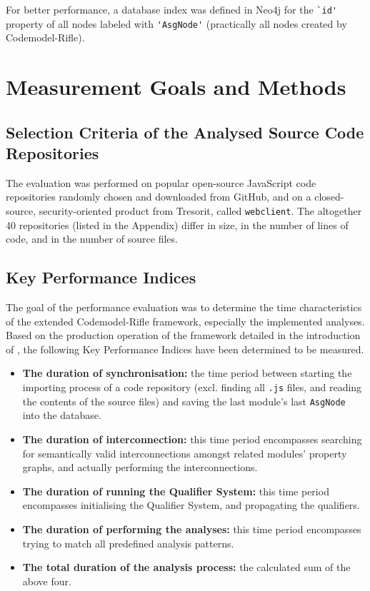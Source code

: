For better performance, a database index was defined in Neo4j for the \lstinline{`id'} property of all nodes labeled with \lstinline{'AsgNode'} (practically all nodes created by Codemodel-Rifle).


\section{Measurement Goals and Methods}

\subsection{Selection Criteria of the Analysed Source Code Repositories}

The evaluation was performed on popular open-source JavaScript code repositories randomly chosen and downloaded from GitHub, and on a closed-source, security-oriented product from Tresorit, called \lstinline{webclient}. The altogether 40 repositories (listed in the Appendix) differ in size, in the number of lines of code, and in the number of source files.


\subsection{Key Performance Indices}

The goal of the performance evaluation was to determine the time characteristics of the extended Codemodel-Rifle framework, especially the implemented analyses. Based on the production operation of the framework detailed in the introduction of , the following Key Performance Indices have been determined to be measured.

\begin{itemize}
\item \textbf{The duration of synchronisation:} the time period between starting the importing process of a code repository (excl. finding all \lstinline{.js} files, and reading the contents of the source files) and saving the last module's last \lstinline{AsgNode} into the database.
\item \textbf{The duration of interconnection:} this time period encompasses searching for semantically valid interconnections amongst related modules' property graphs, and actually performing the interconnections.
\item \textbf{The duration of running the Qualifier System:} this time period encompasses initialising the Qualifier System, and propagating the qualifiers.
\item \textbf{The duration of performing the analyses:} this time period encompasses trying to match all predefined analysis patterns.
\item \textbf{The total duration of the analysis process:} the calculated sum of the above four.
\end{itemize}

